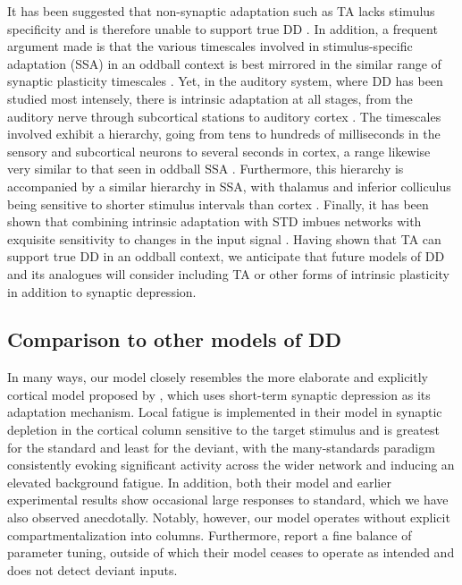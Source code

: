 \documentclass[10pt,letterpaper]{article}
\begin{document}
It has been suggested that non-synaptic adaptation such as TA lacks stimulus specificity and is therefore unable to support true DD \cite{Duque2015-eu, Yarden2017-eh}. In addition, a frequent argument made is that the various timescales involved in stimulus-specific adaptation (SSA) in an oddball context \cite{Ulanovsky2004-nf} is best mirrored in the similar range of synaptic plasticity timescales \cite{Tsodyks1997-qt, Varela1997-nr}. Yet, in the auditory system, where DD has been studied most intensely, there is intrinsic adaptation at all stages, from the auditory nerve \cite{Yates1983-uu, Westerman1984-ge} through subcortical stations \cite{Ingham2004-wc} to auditory cortex \cite{Abolafia2011-ig}. The timescales involved exhibit a hierarchy, going from tens to hundreds of milliseconds in the sensory and subcortical neurons to several seconds in cortex, a range likewise very similar to that seen in oddball SSA \cite{Ulanovsky2004-nf}. Furthermore, this hierarchy is accompanied by a similar hierarchy in SSA, with thalamus and inferior colliculus being sensitive to shorter stimulus intervals than cortex \cite{Perez-Gonzalez2014-pm}. Finally, it has been shown that combining intrinsic adaptation with STD imbues networks with exquisite sensitivity to changes in the input signal \cite{Puccini2006-tm}. Having shown that TA can support true DD in an oddball context, we anticipate that future models of DD and its analogues will consider including TA or other forms of intrinsic plasticity in addition to synaptic depression.

\subsection*{Comparison to other models of DD}

In many ways, our model closely resembles the more elaborate and explicitly cortical model proposed by \cite{Yarden2017-eh}, which uses short-term synaptic depression as its adaptation mechanism. Local fatigue is implemented in their model in synaptic depletion in the cortical column sensitive to the target stimulus and is greatest for the standard and least for the deviant, with the many-standards paradigm consistently evoking significant activity across the wider network and inducing an elevated background fatigue. In addition, both their model and earlier experimental results \cite{Hershenhoren2014-bb} show occasional large responses to standard, which we have also observed anecdotally. Notably, however, our model operates without explicit compartmentalization into columns. Furthermore, \cite{Yarden2017-eh} report a fine balance of parameter tuning, outside of which their model ceases to operate as intended and does not detect deviant inputs.
\end{document}
